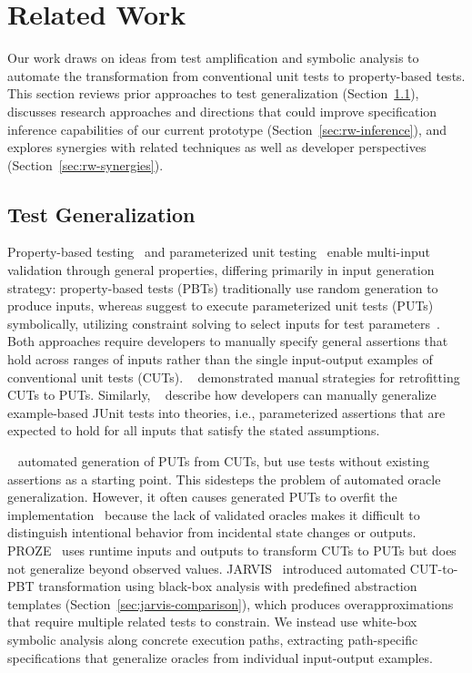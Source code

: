 \section{Related Work}%
\label{sec:related-work}

Our work draws on ideas from test amplification and symbolic analysis
to automate the transformation from conventional unit tests to property-based tests.
This section reviews prior approaches to test generalization
(Section~\ref{sec:rw-generalization}),
discusses research approaches and directions that could
improve specification inference capabilities of our current prototype
(Section~\ref{sec:rw-inference}),
and explores synergies with related techniques as well as developer perspectives
(Section~\ref{sec:rw-synergies}).

\subsection{Test Generalization}%
\label{sec:rw-generalization}

Property-based testing~\cite{claessen_2000_quickcheck} and
parameterized unit testing~\cite{tillmann_2005_parameterized}
enable multi-input validation through general properties,
differing primarily in input generation strategy:
property-based tests (PBTs) traditionally use random generation to produce inputs,
whereas \citeauthor{tillmann_2008_pex}
suggest to execute parameterized unit tests (PUTs) symbolically,
utilizing constraint solving to select inputs
for test parameters~\cite{tillmann_2008_pex}.
Both approaches require developers
to manually specify general assertions
that hold across ranges of inputs
rather than the single input-output examples
of conventional unit tests (CUTs).
\citeauthor{thummalapenta_2011_retrofitting}~\cite{thummalapenta_2011_retrofitting}
demonstrated manual strategies for retrofitting CUTs to PUTs.
Similarly, \citeauthor{saff_2008_theories}~\cite{saff_2008_theories}
describe how developers can manually generalize example-based JUnit tests into theories,
i.e., parameterized assertions that are expected to hold
for all inputs that satisfy the stated assumptions.

\citeauthor{fraser_2011_generating_put}~\cite{fraser_2011_generating_put}
automated generation of PUTs from CUTs, but use tests without existing assertions
as a starting point.
This sidesteps the problem of automated oracle generalization.
However, it often causes generated PUTs to overfit the implementation~\cite{fraser_2011_generating_put}
because the lack of validated oracles 
makes it difficult to distinguish
intentional behavior from incidental state changes or outputs.
PROZE~\cite{tiwari_2024_proze} uses runtime inputs and outputs to transform CUTs to PUTs
but does not generalize beyond observed values.
JARVIS~\cite{peleg_2018_jarvis} introduced automated CUT-to-PBT transformation
using black-box analysis with predefined abstraction templates (Section~\ref{sec:jarvis-comparison}),
which produces overapproximations that require multiple related tests to constrain.
We instead use white-box symbolic analysis along concrete execution paths,
extracting path-specific specifications that generalize oracles
from individual input-output examples.

